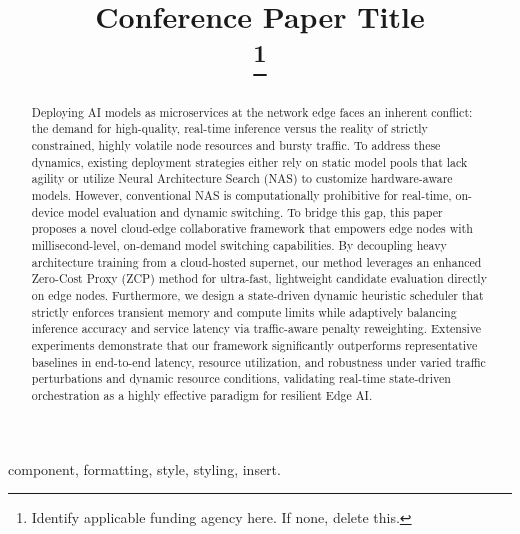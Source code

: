 \documentclass[conference]{IEEEtran}
\begin{document}
\title{Conference Paper Title\\
\thanks{Identify applicable funding agency here. If none, delete this.}
}

\author{
}

\maketitle

\begin{abstract}
Deploying AI models as microservices at the network edge faces an inherent conflict: the demand for high-quality, real-time inference versus the reality of strictly constrained, highly volatile node resources and bursty traffic. To address these dynamics, existing deployment strategies either rely on static model pools that lack agility or utilize Neural Architecture Search (NAS) to customize hardware-aware models. However, conventional NAS is computationally prohibitive for real-time, on-device model evaluation and dynamic switching. To bridge this gap, this paper proposes a novel cloud-edge collaborative framework that empowers edge nodes with millisecond-level, on-demand model switching capabilities. By decoupling heavy architecture training from a cloud-hosted supernet, our method leverages an enhanced Zero-Cost Proxy (ZCP) method for ultra-fast, lightweight candidate evaluation directly on edge nodes. Furthermore, we design a state-driven dynamic heuristic scheduler that strictly enforces transient memory and compute limits while adaptively balancing inference accuracy and service latency via traffic-aware penalty reweighting. Extensive experiments demonstrate that our framework significantly outperforms representative baselines in end-to-end latency, resource utilization, and robustness under varied traffic perturbations and dynamic resource conditions, validating real-time state-driven orchestration as a highly effective paradigm for resilient Edge AI.
\end{abstract}

\begin{IEEEkeywords}
component, formatting, style, styling, insert.
\end{IEEEkeywords}
\end{document}
